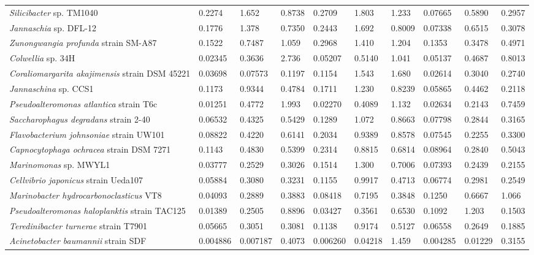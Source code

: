 \begin{sidewaystable}
\begin{tabularx}{\textheight}{Xlllllllll}
\emph{Silicibacter} sp. TM1040 & 0.2274 & 1.652 & 0.8738 & 0.2709 & 1.803 & 1.233 & 0.07665 & 0.5890 & 0.2957\\
\emph{Jannaschia} sp. DFL-12 & 0.1776 & 1.378 & 0.7350 & 0.2443 & 1.692 & 0.8009 & 0.07338 & 0.6515 & 0.3078\\
\emph{Zunongwangia profunda} strain SM-A87 & 0.1522 & 0.7487 & 1.059 & 0.2968 & 1.410 & 1.204 & 0.1353 & 0.3478 & 0.4971\\
\emph{Colwellia} sp. 34H & 0.02345 & 0.3636 & 2.736 & 0.05207 & 0.5140 & 1.041 & 0.05137 & 0.4687 & 0.8013\\
\emph{Coraliomargarita akajimensis} strain DSM 45221 & 0.03698 & 0.07573 & 0.1197 & 0.1154 & 1.543 & 1.680 & 0.02614 & 0.3040 & 0.2740\\
\emph{Jannaschina} sp. CCS1 & 0.1173 & 0.9344 & 0.4784 & 0.1711 & 1.230 & 0.8239 & 0.05865 & 0.4462 & 0.2118\\
\emph{Pseudoalteromonas atlantica} strain T6c & 0.01251 & 0.4772 & 1.993 & 0.02270 & 0.4089 & 1.132 & 0.02634 & 0.2143 & 0.7459\\
\emph{Saccharophagus degradans} strain 2-40 & 0.06532 & 0.4325 & 0.5429 & 0.1289 & 1.072 & 0.8663 & 0.07798 & 0.2844 & 0.3165\\
\emph{Flavobacterium johnsoniae} strain UW101 & 0.08822 & 0.4220 & 0.6141 & 0.2034 & 0.9389 & 0.8578 & 0.07545 & 0.2255 & 0.3300\\
\emph{Capnocytophaga ochracea} strain DSM 7271 & 0.1143 & 0.4830 & 0.5399 & 0.2314 & 0.8815 & 0.6814 & 0.08964 & 0.2840 & 0.5043\\
\emph{Marinomonas} sp. MWYL1 & 0.03777 & 0.2529 & 0.3026 & 0.1514 & 1.300 & 0.7006 & 0.07393 & 0.2439 & 0.2155\\
\emph{Cellvibrio japonicus} strain Ueda107 & 0.05884 & 0.3080 & 0.3231 & 0.1155 & 0.9917 & 0.4713 & 0.06774 & 0.2981 & 0.2549\\
\emph{Marinobacter hydrocarbonoclasticus} VT8 & 0.04093 & 0.2889 & 0.3883 & 0.08418 & 0.7195 & 0.3848 & 0.1250 & 0.6667 & 1.066\\
\emph{Pseudoalteromonas haloplanktis} strain TAC125 & 0.01389 & 0.2505 & 0.8896 & 0.03427 & 0.3561 & 0.6530 & 0.1092 & 1.203 & 0.1503\\
\emph{Teredinibacter turnerae} strain T7901 & 0.05665 & 0.3051 & 0.3081 & 0.1138 & 0.9174 & 0.5127 & 0.06558 & 0.2649 & 0.1885\\
\emph{Acinetobacter baumannii} strain SDF & 0.004886 & 0.007187 & 0.4073 & 0.006260 & 0.04218 & 1.459 & 0.004285 & 0.01229 & 0.3155\\

\bottomrule
\end{tabularx}
\end{sidewaystable}
